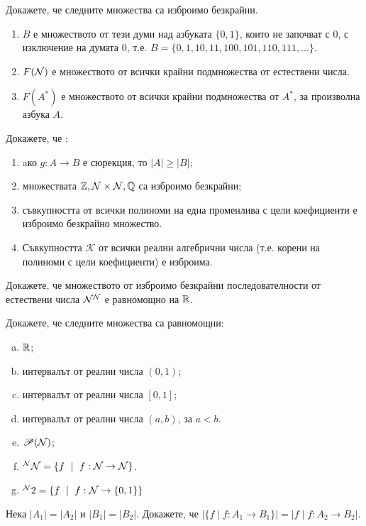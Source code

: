 \begin{problem}
  Докажете, че следните множества са изброимо безкрайни.
  \begin{enumerate}[1)]
  \item
    $B$ е множеството от тези думи над азбуката $\{0,1\}$, които не започват с $0$, с изключение на 
    думата $0$, т.е. $B = \{0, 1, 10, 11, 100, 101, 110, 111, \dots\}$.
  \item
    $F(\mathcal{N})$ е множеството от всички крайни подмножества от естествени числа.
  \item
    $F(A^*)$ е множеството от всички крайни подмножества от $A^*$, за произволна азбука $A$.
  \end{enumerate}
\end{problem}


\begin{problem}
  Докажете, че :
  \begin{enumerate}
  \item
    aко $g:A\rightarrow B$ е сюрекция, то $|A|\geq |B|$;
  \item
    множествата $\mathbb{Z},\mathcal{N}\times\mathcal{N},\mathbb{Q}$ са изброимо безкрайни;
  \item
    съвкупността от всички полиноми на една променлива с цели коефициенти е изброимо безкрайно множество.
  \item
    Съвкупността $\mathscr{K}$ от всички реални алгебрични числа (т.е. корени на полиноми с цели коефициенти) е изброима.
  \end{enumerate}
\end{problem}

\begin{problem}
  Докажете, че множеството от изброимо безкрайни последователности от естествени числа $\mathcal{N}^{\mathcal{N}}$ е равномощно на $\mathbb{R}$.
\end{problem}

\begin{problem}
  Докажете, че следните множества са равномощни:
  \begin{enumerate}[a)]
  \item
    $\mathbb{R}$;
  \item
    интервалът от реални числа $(0,1)$;
\item
    интервалът от реални числа $[0,1]$;
  \item
    интервалът от реални числа $(a,b)$, за $a<b$.
  \item
    $\mathscr{P}(\mathcal{N})$;
  \item
    $^\N\N = \{f\ \mid\ f:\N\to\N\}$.
  \item
    $^\N2 = \{f\ \mid\ f:\N\to\{0,1\}\}$
\end{enumerate}
\end{problem}

\begin{problem}
  Нека $|A_1| = |A_2|$ и $|B_1| = |B_2|$.
  Докажете, че $|\{f\mid f:A_1\to B_1\}| = |f\mid f:A_2\to B_2|$.
\end{problem}

